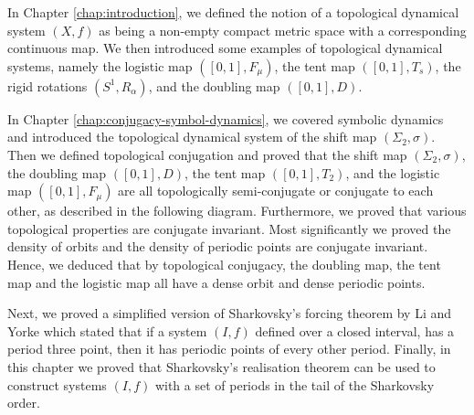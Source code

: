 In Chapter \ref{chap:introduction}, we defined the notion of a topological dynamical system $(X, f)$ as being a non-empty compact metric space with a corresponding continuous map. We then introduced some examples of topological dynamical systems, namely the logistic map $([0, 1], F_\mu)$, the tent map $([0, 1], T_s)$, the rigid rotations $(S^1, R_\alpha)$, and the doubling map $([0, 1], D)$.

In Chapter \ref{chap:conjugacy-symbol-dynamics}, we covered symbolic dynamics and introduced the topological dynamical system of the shift map $(\Sigma_2, \sigma)$. Then we defined topological conjugation and proved that the shift map $(\Sigma_2, \sigma)$, the doubling map $([0, 1], D)$, the tent map $([0, 1], T_2)$, and the logistic map $([0, 1], F_\mu)$ are all topologically semi-conjugate or conjugate to each other, as described in the following diagram. Furthermore, we proved that various topological properties are conjugate invariant. Most significantly we proved the density of orbits and the density of periodic points are conjugate invariant. Hence, we deduced that by topological conjugacy, the doubling map, the tent map and the logistic map all have a dense orbit and dense periodic points.
\begin{center}
\end{center}
Next, we proved a simplified version of Sharkovsky's forcing theorem by Li and Yorke \cite{li-yorke} which stated that if a system $(I, f)$ defined over a closed interval, has a period three point, then it has periodic points of every other period. Finally, in this chapter we proved that Sharkovsky's realisation theorem can be used to construct systems $(I, f)$ with a set of periods in the tail of the Sharkovsky order.

